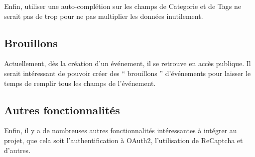 Enfin, utiliser une auto-complétion sur les champs de Categorie et de Tags ne serait pas de trop pour ne pas multiplier les données inutilement.

\subsection{Brouillons}

Actuellement, dès la création d'un événement, il se retrouve en accès publique. Il serait intéressant de pouvoir créer des `` brouillons '' d'événements pour laisser le temps de remplir tous les champs de l'événement.

\subsection{Autres fonctionnalités}

Enfin, il y a de nombreuses autres fonctionnalités intéressantes à intégrer au projet, que cela soit l'authentification à OAuth2, l'utilisation de ReCaptcha et d'autres.